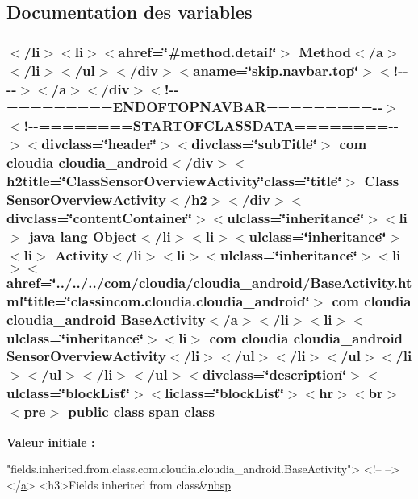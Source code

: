 \subsection{Documentation des variables}
\hypertarget{_sensor_overview_activity_8html_a136ecd631d8bdb3ac8dffb41b96d2f09}{
\subsubsection[{class}]{\setlength{\rightskip}{0pt plus 5cm}$<$/li$>$$<$li$>$$<$ahref=\char`\"{}\#method.\-detail\char`\"{}$>$ Method$<$/{\bf a}$>$$<$/li$>$$<$/ul$>$$<$/div$>$$<$aname=\char`\"{}skip.\-navbar.\-top\char`\"{}$>$$<$!-\/-\/-\/-\/$>$$<$/a$>$$<$/div$>$$<$!-\/-\/=========E\-N\-D\-O\-F\-T\-O\-P\-N\-A\-V\-B\-A\-R=========-\/-\/$>$$<$!-\/-\/========S\-T\-A\-R\-T\-O\-F\-C\-L\-A\-S\-S\-D\-A\-T\-A========-\/-\/$>$$<$divclass=\char`\"{}header\char`\"{}$>$$<$divclass=\char`\"{}sub\-Title\char`\"{}$>$ com cloudia cloudia\-\_\-android$<$/div$>$$<$h2title=\char`\"{}Class\-Sensor\-Overview\-Activity\char`\"{}class=\char`\"{}title\char`\"{}$>$ Class {\bf Sensor\-Overview\-Activity}$<$/h2$>$$<$/div$>$$<$divclass=\char`\"{}content\-Container\char`\"{}$>$$<$ulclass=\char`\"{}inheritance\char`\"{}$>$$<$li$>$ java lang Object$<$/li$>$$<$li$>$$<$ulclass=\char`\"{}inheritance\char`\"{}$>$$<$li$>$ Activity$<$/li$>$$<$li$>$$<$ulclass=\char`\"{}inheritance\char`\"{}$>$$<$li$>$$<$ahref=\char`\"{}../../../com/cloudia/cloudia\-\_\-android/Base\-Activity.\-html\char`\"{}title=\char`\"{}classincom.\-cloudia.\-cloudia\-\_\-android\char`\"{}$>$ com cloudia cloudia\-\_\-android {\bf Base\-Activity}$<$/{\bf a}$>$$<$/li$>$$<$li$>$$<$ulclass=\char`\"{}inheritance\char`\"{}$>$$<$li$>$ com cloudia cloudia\-\_\-android {\bf Sensor\-Overview\-Activity}$<$/li$>$$<$/ul$>$$<$/li$>$$<$/ul$>$$<$/li$>$$<$/ul$>$$<$/li$>$$<$/ul$>$$<$divclass=\char`\"{}description\char`\"{}$>$$<$ulclass=\char`\"{}block\-List\char`\"{}$>$$<$liclass=\char`\"{}block\-List\char`\"{}$>$$<$hr$>$$<$br$>$$<$pre$>$ public class {\bf span} class}}\label{_sensor_overview_activity_8html_a136ecd631d8bdb3ac8dffb41b96d2f09}
{\bfseries Valeur initiale \-:}
\begin{DoxyCode}
\textcolor{stringliteral}{"fields.inherited.from.class.com.cloudia.cloudia\_android.BaseActivity"}>
<!--   -->
</\hyperlink{stylesheet_8css_a5e8981582017bb8b84c21f148345d1f7}{a}>
<h3>Fields inherited from \textcolor{keyword}{class}&\hyperlink{allclasses-frame_8html_aef915316f784c9063d942974538301a6}{nbsp}
\end{DoxyCode}

